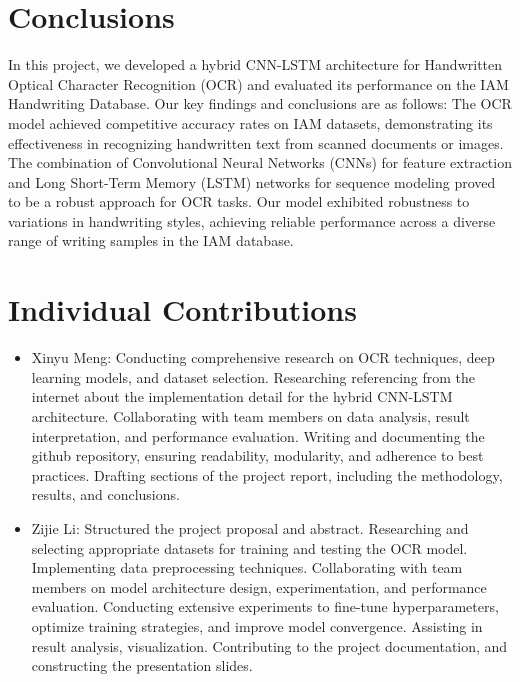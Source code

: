 \documentclass{article}
\begin{document}
\section{Conclusions}

In this project, we developed a hybrid CNN-LSTM architecture for Handwritten Optical Character Recognition (OCR) and evaluated its performance on the IAM Handwriting Database. Our key findings and conclusions are as follows:
The OCR model achieved competitive accuracy rates on IAM datasets, demonstrating its effectiveness in recognizing handwritten text from scanned documents or images. The combination of Convolutional Neural Networks (CNNs) for feature extraction and Long Short-Term Memory (LSTM) networks for sequence modeling proved to be a robust approach for OCR tasks.
Our model exhibited robustness to variations in handwriting styles, achieving reliable performance across a diverse range of writing samples in the IAM database. 

\section{Individual Contributions}

\begin{itemize}
    \item {Xinyu Meng}: Conducting comprehensive research on OCR techniques, deep learning models, and dataset selection. Researching referencing from the internet about the implementation detail for the hybrid CNN-LSTM architecture. Collaborating with team members on data analysis, result interpretation, and performance evaluation. Writing and documenting the github repository, ensuring readability, modularity, and adherence to best practices. Drafting sections of the project report, including the methodology, results, and conclusions.
    \item {Zijie Li}: Structured the project proposal and abstract. Researching and selecting appropriate datasets for training and testing the OCR model. Implementing data preprocessing techniques. Collaborating with team members on model architecture design, experimentation, and performance evaluation. Conducting extensive experiments to fine-tune hyperparameters, optimize training strategies, and improve model convergence. Assisting in result analysis, visualization. Contributing to the project documentation, and constructing the presentation slides. 
\end{itemize}
\end{document}
